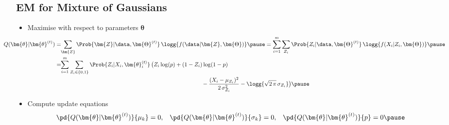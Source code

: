 \begin{slide}
\section{EM for Mixture of Gaussians}

\begin{PauseHighLight}
  \begin{itemize}
  \item Maximise with respect to parameters $\bm{\theta}$
    {\small
      \begin{align*}
       \hspace{-1.5cm} Q(\bm{\theta}|\bm{\theta}^{(t)})
      &=\!\! \sum_{\bm{Z}} \Prob{\bm{Z}|\data,\bm{\Theta}^{(t)}}\,
        \logg{f(\data|\bm{Z}, \bm{\Theta})} \pause
        = \sum_{i=1}^m \sum_{Z_i }\Prob{Z_i|\data,\bm{\Theta}^{(t)}}\,
        \logg{f(X_i|Z_i, \bm{\Theta})}\pause
        \\
      &=\!\!\sum_{i=1}^m \sum_{Z_i\in\{0,1\}} \Prob{Z_i|X_i,\bm{\theta}^{(t)}_i}\,
        \bigl( Z_i \log(p) + (1-Z_i)\log(1-p) \\
        & \hspace{9cm}  -
        \frac{(X_i-\mu_{Z_i})^2}{2\,\sigma^2_{Z_i}} - \logg{\sqrt{2\,\pi}\,\sigma_{Z_i}} \bigr)\pause
    \end{align*} }
  \item Compute update equations
    \begin{align*}
      \pd{Q(\bm{\theta}|\bm{\theta}^{(t)})}{\mu_k}=0,
      &&
         \pd{Q(\bm{\theta}|\bm{\theta}^{(t)})}{\sigma_k}=0,
      &&
          \pd{Q(\bm{\theta}|\bm{\theta}^{(t)})}{p}=0\pause
    \end{align*}
  \end{itemize}
\end{PauseHighLight}

\end{slide}


